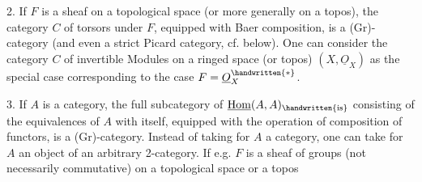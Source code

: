  2. If $F$ is a sheaf on a topological space (or more generally on a topos), the category $C$ of torsors under $F$, equipped with Baer composition, is a (Gr)-category (and even a strict Picard category, cf. below). One can consider the category $C$ of invertible Modules on a  ringed space (or topos)  $(X,\underline{O}_{X})$ as the special case corresponding to the case $F=\underline{O}_{X}^{\handwritten{*}}$.

 3. If $A$ is a category, the full subcategory  of $\underline{\mathrm{Hom}}(A,A)_{\handwritten{\mathrm{is}}}$ consisting of the equivalences of $A$ with itself, equipped with the operation of composition of functors, is a (Gr)-category. Instead of taking for $A$ a category, one can  take for $A$ an object of an arbitrary 2-category. If e.g. $F$ is a sheaf of groups (not necessarily commutative) on a topological space \handwritten{(}or a topos\handwritten{)}\handwritten{,}
